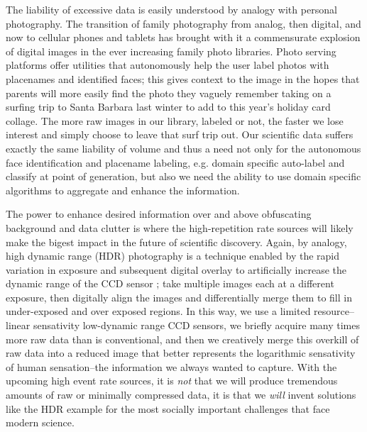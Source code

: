 \documentclass{article}
\begin{document}
The liability of excessive data is easily understood by analogy with personal photography.
The transition of family photography from analog, then digital, and now to cellular phones and tablets has brought with it a commensurate explosion of digital images in the ever increasing family photo libraries.
Photo serving platforms offer utilities that autonomously help the user label photos with placenames and identified faces; this gives context to the image in the hopes that parents will more easily find the photo they vaguely remember taking on a surfing trip to Santa Barbara last winter to add to this year's holiday card collage.
The more raw images in our library, labeled or not, the faster we lose interest and simply choose to leave that surf trip out.
Our scientific data suffers exactly the same liability of volume and thus a need not only for the autonomous face identification and placename labeling, e.g. domain specific auto-label and classify at point of generation, but also we need the ability to use domain specific algorithms to aggregate and enhance the information.


The power to enhance desired information over and above obfuscating background and data clutter is where the high-repetition rate sources will likely make the bigest impact in the future of scientific discovery.
Again, by analogy, high dynamic range (HDR) photography is a technique enabled by the rapid variation in exposure and subsequent digital overlay to artificially increase the dynamic range of the CCD sensor \cite{hdr_ref1994}; take multiple images each at a different exposure, then digitally align the images and differentially merge them to fill in under-exposed and over exposed regions.
In this way, we use a limited resource--linear sensativity low-dynamic range CCD sensors, we briefly acquire many times more raw data than is conventional, and then we creatively merge this overkill of raw data into a reduced image that better represents the logarithmic sensativity of human sensation--the information we always wanted to capture.
With the upcoming high event rate sources, it is \emph{not} that we will produce tremendous amounts of raw or minimally compressed data, it is that we \emph{will} invent solutions like the HDR example for the most socially important challenges that face modern science.

\end{document}
